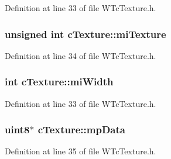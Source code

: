 Definition at line 33 of file WTcTexture.h.

\hypertarget{classc_texture_a2cb17befe78a334841fd638209769fee}{
\subsubsection[{miTexture}]{\setlength{\rightskip}{0pt plus 5cm}unsigned int {\bf cTexture::miTexture}}}
\label{classc_texture_a2cb17befe78a334841fd638209769fee}


Definition at line 34 of file WTcTexture.h.

\hypertarget{classc_texture_a1ecd8f15575d19e74da1c98c87b1180b}{
\subsubsection[{miWidth}]{\setlength{\rightskip}{0pt plus 5cm}int {\bf cTexture::miWidth}}}
\label{classc_texture_a1ecd8f15575d19e74da1c98c87b1180b}


Definition at line 33 of file WTcTexture.h.

\hypertarget{classc_texture_a0ecab78514040b6542e6616ee480d2d9}{
\subsubsection[{mpData}]{\setlength{\rightskip}{0pt plus 5cm}uint8$\ast$ {\bf cTexture::mpData}}}
\label{classc_texture_a0ecab78514040b6542e6616ee480d2d9}


Definition at line 35 of file WTcTexture.h.

